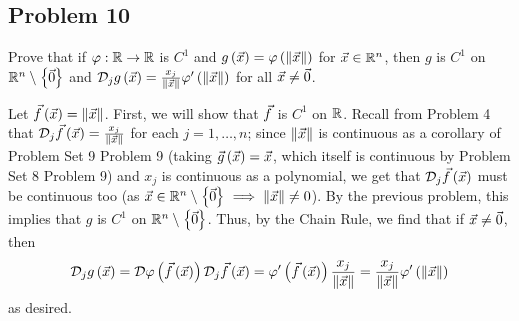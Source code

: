 \documentclass[main.tex]{subfiles}
\begin{document}
\subsection{Problem 10}
\begin{claim}
    Prove that if $\varphi : \mathbb R \to  \mathbb R$ is $C^1$ and $g\left( \vec{x} \right) = \varphi\left( \left\lVert \vec{x} \right\rVert \right)$ for $\vec{x} \in \mathbb R^n$, then $g$ is $C^1$ on $\mathbb R^n \setminus \left\{ \vec{0} \right\}$ and $\mathcal{D}_j g\left( \vec{x} \right) = \frac{x_j}{\left\lVert \vec{x} \right\rVert}\varphi'\left( \left\lVert \vec{x} \right\rVert \right)$ for all $\vec{x} \neq \vec{0}$.
\end{claim}

\begin{soln}
    Let $\vec{f}\left( \vec{x} \right) = \left\lVert \vec{x} \right\rVert$. First, we will show that $\vec{f}$ is $C^1$ on $\mathbb R$. Recall from Problem 4 that $\mathcal{D}_j\vec{f}\left( \vec{x} \right) = \frac{x_j}{\left\lVert \vec{x} \right\rVert}$ for each $j = 1, \ldots , n$; since $\left\lVert \vec{x} \right\rVert$ is continuous as a corollary of Problem Set 9 Problem 9 (taking $\vec{g}\left( \vec{x} \right) = \vec{x}$, which itself is continuous by Problem Set 8 Problem 9) and $x_j$ is continuous as a polynomial, we get that $\mathcal{D}_j\vec{f}\left( \vec{x} \right)$ must be continuous too (as $\vec{x}\in \mathbb R^n\setminus\left\{ \vec{0} \right\}\implies \left\lVert \vec{x} \right\rVert \neq 0$). By the previous problem, this implies that $g$ is $C^1$ on $\mathbb R^n\setminus\left\{ \vec{0} \right\}$. Thus, by the Chain Rule, we find that if $\vec{x}\neq \vec{0}$, then
    \[\mathcal{D}_jg\left( \vec{x} \right) = \mathcal{D} \varphi\left( \vec{f}\left( \vec{x} \right) \right) \mathcal{D}_j\vec{f}\left( \vec{x} \right) = \varphi'\left( \vec{f}\left( \vec{x} \right) \right) \frac{x_j}{\left\lVert \vec{x} \right\rVert} = \frac{x_j}{\left\lVert \vec{x} \right\rVert}\varphi'\left( \left\lVert \vec{x} \right\rVert \right)\]
    as desired.
\end{soln}
\eject
\end{document}
